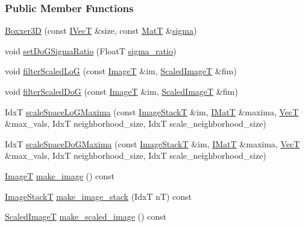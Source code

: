 \subsubsection*{Public Member Functions}
\begin{DoxyCompactItemize}
\item 
\hyperlink{classboxxer_1_1Boxxer3D_ac010173e25bea7fcfbf7a532ec00de1f}{Boxxer3D} (const \hyperlink{classboxxer_1_1Boxxer3D_a62a7f35aa283e2a833d13edaa228bca2}{I\+VecT} \&size, const \hyperlink{classboxxer_1_1Boxxer3D_ae155080a591506ca84d3d70f1cde337d}{MatT} \&\hyperlink{classboxxer_1_1Boxxer3D_a5df6b670e57ee7b6c2396650f6caba86}{sigma})
\item 
void \hyperlink{classboxxer_1_1Boxxer3D_a22933f928d48cfa58dbada555d8a1d1e}{set\+Do\+G\+Sigma\+Ratio} (FloatT \hyperlink{classboxxer_1_1Boxxer3D_a63a9a0d9c56c11f34c7f2c80e0556335}{sigma\+\_\+ratio})
\item 
void \hyperlink{classboxxer_1_1Boxxer3D_a54ce058d4f00b44b40808cdc964ea7f5}{filter\+Scaled\+LoG} (const \hyperlink{classboxxer_1_1Boxxer3D_a8990923b1207fc8ae066de124ab75053}{ImageT} \&im, \hyperlink{classboxxer_1_1Boxxer3D_aefd3895d7a0790a08de4714ee7a59d97}{Scaled\+ImageT} \&fim)
\item 
void \hyperlink{classboxxer_1_1Boxxer3D_ae1e5a4f23ea5909e10e0545e56e334df}{filter\+Scaled\+DoG} (const \hyperlink{classboxxer_1_1Boxxer3D_a8990923b1207fc8ae066de124ab75053}{ImageT} \&im, \hyperlink{classboxxer_1_1Boxxer3D_aefd3895d7a0790a08de4714ee7a59d97}{Scaled\+ImageT} \&fim)
\item 
IdxT \hyperlink{classboxxer_1_1Boxxer3D_aa3a28765766e21dc7b994da8c056fe47}{scale\+Space\+Lo\+G\+Maxima} (const \hyperlink{classboxxer_1_1Boxxer3D_aa17e25866089479e9b40ea01dfad8a88}{Image\+StackT} \&im, \hyperlink{classboxxer_1_1Boxxer3D_a9b8cb89e1f1fbf091e5443876ca9a200}{I\+MatT} \&maxima, \hyperlink{classboxxer_1_1Boxxer3D_a74e56a85bc18204a802bbf2a76eea61c}{VecT} \&max\+\_\+vals, IdxT neighborhood\+\_\+size, IdxT scale\+\_\+neighborhood\+\_\+size)
\item 
IdxT \hyperlink{classboxxer_1_1Boxxer3D_a66040edbfb27cdc2d73be9789b7ca676}{scale\+Space\+Do\+G\+Maxima} (const \hyperlink{classboxxer_1_1Boxxer3D_aa17e25866089479e9b40ea01dfad8a88}{Image\+StackT} \&im, \hyperlink{classboxxer_1_1Boxxer3D_a9b8cb89e1f1fbf091e5443876ca9a200}{I\+MatT} \&maxima, \hyperlink{classboxxer_1_1Boxxer3D_a74e56a85bc18204a802bbf2a76eea61c}{VecT} \&max\+\_\+vals, IdxT neighborhood\+\_\+size, IdxT scale\+\_\+neighborhood\+\_\+size)
\item 
\hyperlink{classboxxer_1_1Boxxer3D_a8990923b1207fc8ae066de124ab75053}{ImageT} \hyperlink{classboxxer_1_1Boxxer3D_a8e86e20a67d0275319436b6d76f8c765}{make\+\_\+image} () const 
\item 
\hyperlink{classboxxer_1_1Boxxer3D_aa17e25866089479e9b40ea01dfad8a88}{Image\+StackT} \hyperlink{classboxxer_1_1Boxxer3D_a25c358eb9570f8a32d892e89b4b02e90}{make\+\_\+image\+\_\+stack} (IdxT nT) const 
\item 
\hyperlink{classboxxer_1_1Boxxer3D_aefd3895d7a0790a08de4714ee7a59d97}{Scaled\+ImageT} \hyperlink{classboxxer_1_1Boxxer3D_a3bc9609e6bdb4a6aac10aea313b70b12}{make\+\_\+scaled\+\_\+image} () const 
\end{DoxyCompactItemize}
